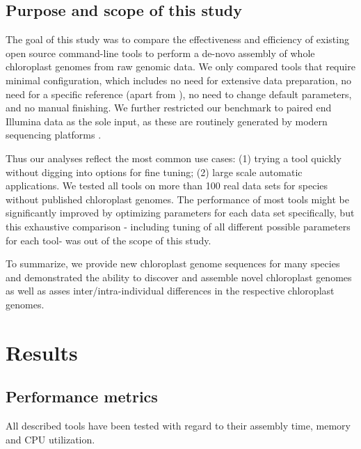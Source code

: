 \documentclass{bmcart}
\begin{document}

\subsection*{Purpose and scope of this study}
The goal of this study was to compare the effectiveness and efficiency of existing open source command-line tools to perform a de-novo assembly of whole chloroplast genomes from raw genomic data.
We only compared tools that require minimal configuration, which includes no need for extensive data preparation, no need for a specific reference (apart from ), no need to change default parameters, and no manual finishing.
We further restricted our benchmark to paired end Illumina data as the sole input, as  these are routinely generated by modern sequencing platforms \cite{Goodwin2016}. 

Thus our analyses reflect the most common use cases: (1) trying a tool quickly without digging into options for fine tuning; (2) large scale automatic applications.
We tested all tools on more than \num{100} real data sets for species without published chloroplast genomes.
The performance of most tools might be significantly improved by optimizing parameters for each data set specifically, but this exhaustive comparison - including tuning of all different possible parameters for each tool- was out of the scope of this study. 

To summarize, we provide new chloroplast genome sequences for many species and demonstrated the ability to discover and assemble novel chloroplast genomes as well as asses inter/intra-individual differences in the respective chloroplast genomes.

\section*{Results}
\subsection*{Performance metrics}
All described tools have been tested with regard to their assembly time, memory and CPU utilization.
\end{document}
